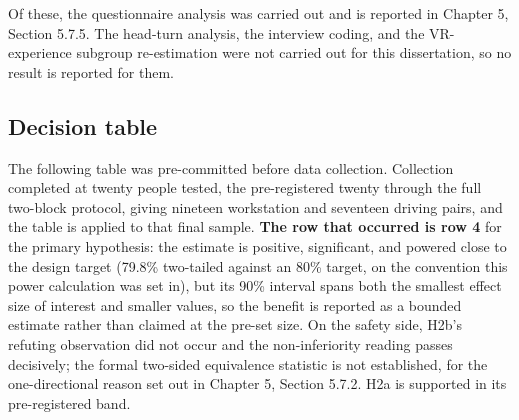 Of these, the questionnaire analysis was carried out and is reported in Chapter 5, Section 5.7.5.
The head-turn analysis, the interview coding, and the VR-experience subgroup re-estimation were
not carried out for this dissertation, so no result is reported for them.

\subsection{Decision table}

The following table was pre-committed before data collection. Collection completed at twenty
people tested, the pre-registered twenty through the full two-block protocol, giving nineteen
workstation and seventeen driving pairs, and the table is
applied to that final sample.
\textbf{The row that occurred is row 4} for the primary hypothesis: the estimate is positive,
significant, and powered close to the design target (79.8\% two-tailed against an 80\% target, on
the convention this power calculation was set in), but its 90\% interval spans both the smallest effect size of
interest and smaller values, so the benefit is reported as a bounded estimate rather than claimed at
the pre-set size. On the safety side, H2b's refuting observation did not occur and the
non-inferiority reading passes decisively; the formal two-sided equivalence statistic is not
established, for the one-directional reason set out in Chapter 5, Section 5.7.2. H2a is supported in
its pre-registered band.

